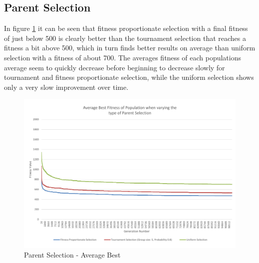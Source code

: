 \clearpage

\subsection{Parent Selection} %
\label{sub:parent_selection}

In figure \ref{fig:ctpsab} it can be seen that fitness proportionate selection with a final fitness of just below 500 is clearly better than the tournament selection that reaches a fitness a bit above 500, which in turn finds better results on average than uniform selection with a fitness of about 700. The averages fitness of each populations average seem to quickly decrease before beginning to decrease slowly for tournament and fitness proportionate selection, while the uniform selection shows only a very slow improvement over time.

\begin{landscape}
\begin{figure}[thbp]
	\centerline{\includegraphics[height=0.945\textwidth]{figures/CircleTests/ParentSelection/CircleTestParentSelectionAverageBest.pdf}}
	\caption{Parent Selection - Average Best}
	\label{fig:ctpsab}
\end{figure}
\end{landscape}

